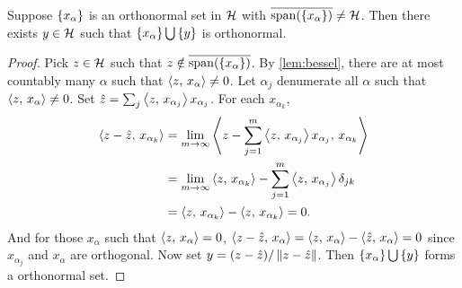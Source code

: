 \begin{lemma}\label{lem:gram_schmidt}
    Suppose $\left\{ {x_\alpha} \right\}$ is an orthonormal set in $\mathcal{H}$ with 
    $\overline{\operatorname{span}(\left\{ {x_\alpha} \right\})}\neq\mathcal{H}$. Then there exists 
    $y\in\mathcal{H}$ such that $\left\{ {x_\alpha} \right\}\bigcup\left\{ {y} \right\}$ is orthonormal.
\end{lemma}
\begin{proof}
    Pick $z\in\mathcal{H}$ such that $z\notin\overline{\operatorname{span}(\left\{ {x_\alpha} \right\})}$. 
    By \cref{lem:bessel}, there are at most countably many $\alpha$ 
    such that $\left\langle {z},\, {x_\alpha} \right\rangle\neq 0$. Let $\alpha_j$ denumerate all 
    $\alpha$ such that $\left\langle {z},\, {x_\alpha} \right\rangle\neq 0$. Set $\hat{z} 
    = \sum_j \left\langle {z},\, {x_{\alpha_j}} \right\rangle x_{\alpha_j}$. For each $x_{\alpha_k}$, 
    \begin{equation*}
        \begin{split}
            \left\langle {z-\hat{z}},\, {x_{\alpha_k}} \right\rangle 
            &= \lim_{m\to\infty} \left\langle {z-\sum_{j=1}^{m}\left\langle {z},\, {x_{\alpha_j}} \right\rangle x_{\alpha_j}},\, {x_{\alpha_k}} \right\rangle \\
            &= \lim_{m\to\infty} \left\langle {z},\, {x_{\alpha_k}} \right\rangle - \sum_{j=1}^{m} \left\langle {z},\, {x_{\alpha_j}} \right\rangle\delta_{jk} \\
            &= \left\langle {z},\, {x_{\alpha_k}} \right\rangle - \left\langle {z},\, {x_{\alpha_k}} \right\rangle = 0.
        \end{split}
    \end{equation*}
    And for those $x_\alpha$ such that $\left\langle {z},\, {x_\alpha} \right\rangle = 0$, 
    $\left\langle {z-\hat{z}},\, {x_\alpha} \right\rangle = \left\langle {z},\, {x_\alpha} \right\rangle - \left\langle {\hat{z}},\, {x_\alpha} \right\rangle = 0$ 
    since $x_{\alpha_j}$ and $x_\alpha$ are orthogonal. Now set 
    $y = (z - \hat{z})/\left\lVert {z - \hat{z}} \right\rVert$. Then $\left\{ {x_\alpha} \right\}\bigcup\left\{ {y} \right\}$ 
    forms a orthonormal set.
\end{proof}

